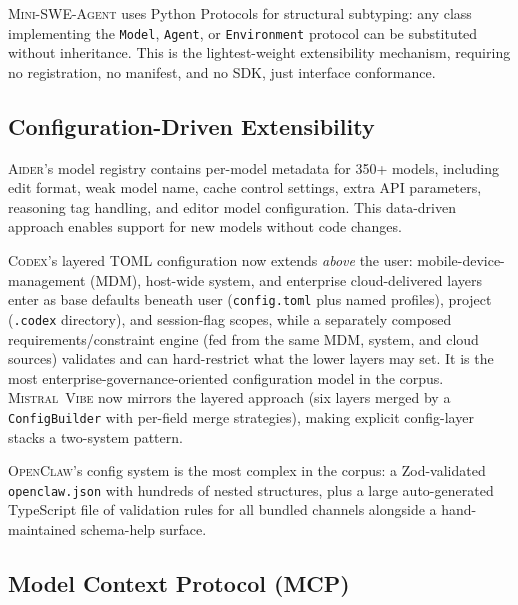 \documentclass[11pt,a4paper]{article}
\newcommand{\cdx}{\textsc{Codex}\xspace}
\newcommand{\adr}{\textsc{Aider}\xspace}
\newcommand{\mswe}{\textsc{Mini-SWE-Agent}\xspace}
\newcommand{\ocl}{\textsc{OpenClaw}\xspace}
\newcommand{\vibe}{\textsc{Mistral~Vibe}\xspace}
\begin{document}
\mswe{} uses Python Protocols for structural subtyping: any class implementing the \texttt{Model}, \texttt{Agent}, or \texttt{Environment} protocol can be substituted without inheritance.
This is the lightest-weight extensibility mechanism, requiring no registration, no manifest, and no SDK, just interface conformance.

\subsection{Configuration-Driven Extensibility}

\adr{}'s model registry contains per-model metadata for 350+ models, including edit format, weak model name, cache control settings, extra API parameters, reasoning tag handling, and editor model configuration.
This data-driven approach enables support for new models without code changes.

\cdx{}'s layered TOML configuration now extends \emph{above} the user: mobile-device-management (MDM), host-wide system, and enterprise cloud-delivered layers enter as base defaults beneath user (\texttt{config.toml} plus named profiles), project (\texttt{.codex} directory), and session-flag scopes, while a separately composed requirements/constraint engine (fed from the same MDM, system, and cloud sources) validates and can hard-restrict what the lower layers may set. It is the most enterprise-governance-oriented configuration model in the corpus.
\vibe{} now mirrors the layered approach (six layers merged by a \texttt{ConfigBuilder} with per-field merge strategies), making explicit config-layer stacks a two-system pattern.

\ocl{}'s config system is the most complex in the corpus: a Zod-validated \texttt{openclaw.json} with hundreds of nested structures, plus a large auto-generated TypeScript file of validation rules for all bundled channels alongside a hand-maintained schema-help surface.

\subsection{Model Context Protocol (MCP)}
\end{document}
